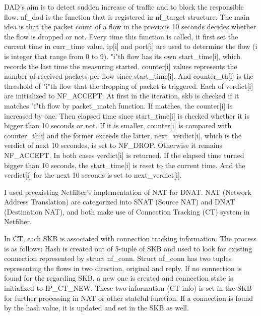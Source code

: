 DAD's aim is to detect sudden increase of traffic and to block the responsible flow. nf\_dad is the function that is registered in nf\_target structure. The main idea is that the packet count of a flow in the previous 10 seconds decides whether the flow is dropped or not. 
Every time this function is called, it first set the current time in curr\_time value. ip[i] and port[i] are used to determine the flow (i is integer that range from 0 to 9). "i"th flow has its own start\_time[i], which records the last time the measuring started. counter[i] values represents the number of received packets per flow since start\_time[i]. And counter\_th[i] is the threshold of "i"th flow that the dropping of packet is triggered. Each of verdict[i] are initialized to NF\_ACCEPT. At first in the iteration, skb is checked if it matches "i"th flow by packet\_match function. If matches, the counter[i] is increased by one. Then elapsed time since start\_time[i] is checked whether it is bigger than 10 seconds or not. If it is smaller, counter[i] is compared with counter\_th[i] and the former exceeds the latter, next\_verdict[i], which is the verdict of next 10 secondes, is set to NF\_DROP. Otherwise it remains NF\_ACCEPT. In both cases verdict[i] is returned. If the elapsed time turned bigger than 10 seconds, the start\_time[i] is reset to the current time. And the verdict[i] for the next 10 seconds is set to next\_verdict[i]. 

I used preexisting Netfilter's implementation of NAT for DNAT. NAT (Network Address Translation) are categorized into SNAT (Source NAT) and DNAT (Destination NAT), and both make use of Connection Tracking (CT) system in Netfilter. 

In CT, each SKB is associated with connection tracking information. The process is as follows: Hash is created out of 5-tuple of SKB and used to look for existing connection represented by struct nf\_conn. Struct nf\_conn has two tuples representing the flows in two direction, original and reply. If no connection is found for the regarding SKB, a new one is created and connection state is initialized to IP\_CT\_NEW. These two information (CT info) is set in the SKB for further processing in NAT or other stateful function. If a connection is found by the hash value, it is updated and set in the SKB as well. 

